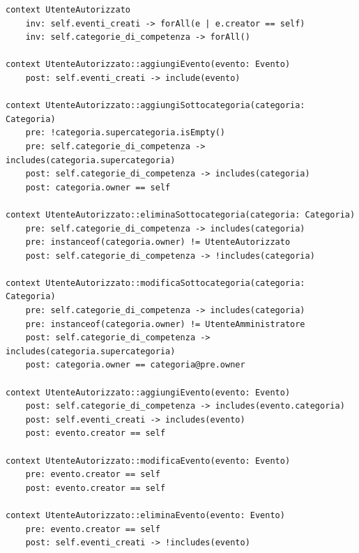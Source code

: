 \documentclass{article}
\begin{document}
\begin{verbatim}
context UtenteAutorizzato
    inv: self.eventi_creati -> forAll(e | e.creator == self)
    inv: self.categorie_di_competenza -> forAll()

context UtenteAutorizzato::aggiungiEvento(evento: Evento)
    post: self.eventi_creati -> include(evento)

context UtenteAutorizzato::aggiungiSottocategoria(categoria: Categoria)
    pre: !categoria.supercategoria.isEmpty()
    pre: self.categorie_di_competenza -> includes(categoria.supercategoria)
    post: self.categorie_di_competenza -> includes(categoria)
    post: categoria.owner == self

context UtenteAutorizzato::eliminaSottocategoria(categoria: Categoria)
    pre: self.categorie_di_competenza -> includes(categoria)
    pre: instanceof(categoria.owner) != UtenteAutorizzato
    post: self.categorie_di_competenza -> !includes(categoria)

context UtenteAutorizzato::modificaSottocategoria(categoria: Categoria)
    pre: self.categorie_di_competenza -> includes(categoria)
    pre: instanceof(categoria.owner) != UtenteAmministratore
    post: self.categorie_di_competenza -> includes(categoria.supercategoria)
    post: categoria.owner == categoria@pre.owner

context UtenteAutorizzato::aggiungiEvento(evento: Evento)
    post: self.categorie_di_competenza -> includes(evento.categoria)
    post: self.eventi_creati -> includes(evento)
    post: evento.creator == self

context UtenteAutorizzato::modificaEvento(evento: Evento)
    pre: evento.creator == self
    post: evento.creator == self

context UtenteAutorizzato::eliminaEvento(evento: Evento)
    pre: evento.creator == self
    post: self.eventi_creati -> !includes(evento)
\end{verbatim}
\end{document}
